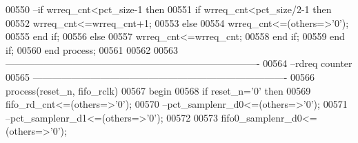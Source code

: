 \begin{DoxyCode}
00550 \textcolor{keyword}{              --if wrreq\_cnt<pct\_size-1 then }
00551                 \textcolor{keywordflow}{if} \textcolor{vhdlchar}{wrreq_cnt}\textcolor{vhdlchar}{<}\textcolor{vhdlchar}{pct_size}\textcolor{vhdlchar}{/}\textcolor{vhdllogic}{2-1} \textcolor{keywordflow}{then} 
00552                   \textcolor{vhdlchar}{wrreq_cnt}\textcolor{vhdlchar}{<=}\textcolor{vhdlchar}{wrreq_cnt}\textcolor{vhdlchar}{+}\textcolor{vhdllogic}{}\textcolor{vhdllogic}{1};
00553               \textcolor{keywordflow}{else} 
00554                   \textcolor{vhdlchar}{wrreq_cnt}\textcolor{vhdlchar}{<=}\textcolor{vhdlchar}{(}\textcolor{keywordflow}{others}\textcolor{vhdlchar}{=}\textcolor{vhdlchar}{>}\textcolor{vhdlchar}{'}\textcolor{vhdllogic}{}\textcolor{vhdllogic}{0}\textcolor{vhdlchar}{'}\textcolor{vhdlchar}{)};
00555               \textcolor{keywordflow}{end} \textcolor{keywordflow}{if};
00556           \textcolor{keywordflow}{else} 
00557               \textcolor{vhdlchar}{wrreq_cnt}\textcolor{vhdlchar}{<=}\textcolor{vhdlchar}{wrreq_cnt};
00558           \textcolor{keywordflow}{end} \textcolor{keywordflow}{if};
00559         \textcolor{keywordflow}{end} \textcolor{keywordflow}{if};
00560     \textcolor{keywordflow}{end} \textcolor{keywordflow}{process};
00561     
00562     
00563 \textcolor{keyword}{-------------------------------------------------------------------------------    }
00564 \textcolor{keyword}{ --rdreq counter}
00565 \textcolor{keyword}{------------------------------------------------------------------------------- }
00566   \textcolor{keywordflow}{process}(reset_n, fifo_rclk)
00567 \textcolor{vhdlkeyword}{    begin}
00568       \textcolor{keywordflow}{if} \textcolor{vhdlchar}{reset_n}\textcolor{vhdlchar}{=}\textcolor{vhdlchar}{'}\textcolor{vhdllogic}{}\textcolor{vhdllogic}{0}\textcolor{vhdlchar}{'} \textcolor{keywordflow}{then}
00569         \textcolor{vhdlchar}{fifo_rd_cnt}\textcolor{vhdlchar}{<=}\textcolor{vhdlchar}{(}\textcolor{keywordflow}{others}\textcolor{vhdlchar}{=}\textcolor{vhdlchar}{>}\textcolor{vhdlchar}{'}\textcolor{vhdllogic}{}\textcolor{vhdllogic}{0}\textcolor{vhdlchar}{'}\textcolor{vhdlchar}{)}; 
00570 \textcolor{keyword}{          --pct\_samplenr\_d0<=(others=>'0');}
00571 \textcolor{keyword}{          --pct\_samplenr\_d1<=(others=>'0');}
00572           
00573            \textcolor{vhdlchar}{fifo0_samplenr_d0}\textcolor{vhdlchar}{<=}\textcolor{vhdlchar}{(}\textcolor{keywordflow}{others}\textcolor{vhdlchar}{=}\textcolor{vhdlchar}{>}\textcolor{vhdlchar}{'}\textcolor{vhdllogic}{}\textcolor{vhdllogic}{0}\textcolor{vhdlchar}{'}\textcolor{vhdlchar}{)};

\end{DoxyCode}
